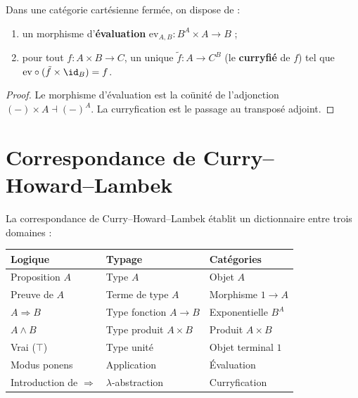 \begin{proposition}\label{prop:eval-curry}
Dans une catégorie cartésienne fermée, on dispose de :
\begin{enumerate}[label=(\alph*)]
\item un morphisme d'\textbf{évaluation}
      $\mathrm{ev}_{A,B} \colon B^A \times A \to B$ ;
\item pour tout $f \colon A \times B \to C$, un unique
      $\tilde{f} \colon A \to C^B$ (le \textbf{curryfié} de $f$)
      tel que $\mathrm{ev} \circ (\tilde{f} \times \id_B) = f$.
\end{enumerate}
\end{proposition}

\begin{proof}
Le morphisme d'évaluation est la coünité de l'adjonction
$(-) \times A \dashv (-)^A$.  La curryfication est le passage au
transposé adjoint.
\end{proof}

\section{Correspondance de Curry--Howard--Lambek}\label{sec:curry-howard-lambek}


La correspondance de Curry--Howard--Lambek établit un dictionnaire
entre trois domaines :

\medskip
\begin{center}
\renewcommand{\arraystretch}{1.3}
\begin{tabular}{lll}
\toprule
\textbf{Logique} & \textbf{Typage} & \textbf{Catégories} \\
\midrule
Proposition $A$ & Type $A$ & Objet $A$ \\
Preuve de $A$ & Terme de type $A$ & Morphisme $1 \to A$ \\
$A \Rightarrow B$ & Type fonction $A \to B$ & Exponentielle $B^A$ \\
$A \wedge B$ & Type produit $A \times B$ & Produit $A \times B$ \\
Vrai ($\top$) & Type unité & Objet terminal $1$ \\
Modus ponens & Application & Évaluation \\
Introduction de $\Rightarrow$ & $\lambda$-abstraction & Curryfication \\
\bottomrule
\end{tabular}
\end{center}

